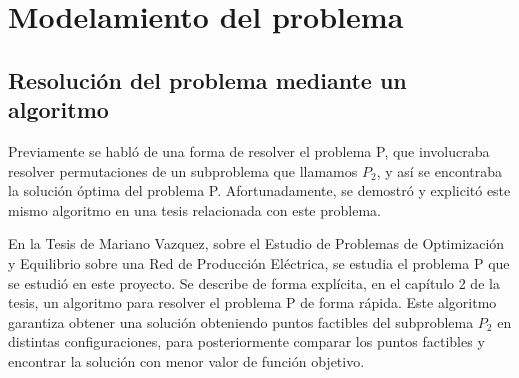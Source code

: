 \documentclass[12pt,twoside]{article}
\begin{document}
	\begin{center}
	\end{center}
	
	
	
	
	\newpage
	
	\section{Modelamiento del problema}
	\subsection{Resoluci\'on del problema mediante un algoritmo}

	\hspace{1cm} Previamente se habl\'o de una forma de resolver el problema P, que involucraba resolver permutaciones de un subproblema que llamamos \(P_2\), y as\'i se encontraba la soluci\'on \'optima del problema P. Afortunadamente, se demostr\'o y explicit\'o este mismo algoritmo en una tesis relacionada con este problema.
	
	\hspace{1cm} En la Tesis de Mariano Vazquez, sobre el Estudio de Problemas de Optimizaci\'on y Equilibrio sobre una Red de Producci\'on El\'ectrica, se estudia el problema P que se estudi\'o en este proyecto. Se describe de forma expl\'icita, en el cap\'itulo 2 de la tesis, un algoritmo para resolver el problema P de forma r\'apida. Este algoritmo garantiza obtener una soluci\'on obteniendo puntos factibles del subproblema \(P_2\) en distintas configuraciones, para posteriormente comparar los puntos factibles y encontrar la soluci\'on con menor valor de funci\'on objetivo. 
	
\end{document}
